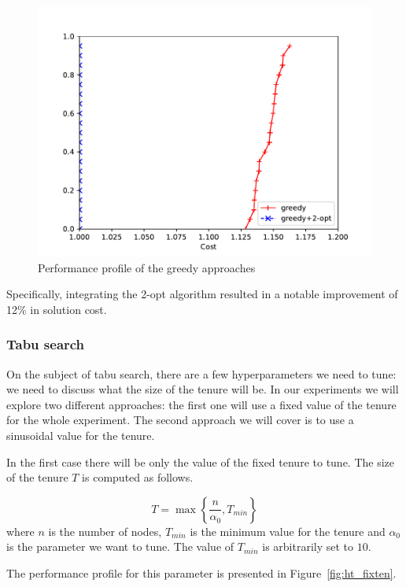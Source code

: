 \documentclass{article}
\begin{document}
\begin{figure}[ht]
        \caption{Performance profile of the greedy approaches}
        \label{fig:ht_greedy}
        \centering
        \includegraphics[width=340pt]{assets/ht_greedy.pdf}
\end{figure}

Specifically, integrating the 2-opt algorithm resulted in a notable improvement of 12\% in solution cost.

\clearpage

\subsubsection{Tabu search}
On the subject of tabu search, there are a few hyperparameters we need to tune:
we need to discuss what the size of the tenure will be. In our
experiments we will explore two different approaches: the first one will use
a fixed value of the tenure for the whole experiment. The second approach we
will cover is to use a sinusoidal value for the tenure.

In the first case there will be only the value of the fixed tenure to tune.
The size of the tenure $T$ is computed as follows.

\begin{equation*}
        T = \max \left\{
                \frac{n}{\alpha_0} ,
                T_{min}
        \right\}
\end{equation*}
where $n$ is the number of nodes, $T_{min}$ is the minimum value for the tenure
and $\alpha_0$ is the parameter we want to tune. The value of $T_{min}$ is arbitrarily
set to $10$.

The performance profile for this parameter is presented in Figure~\ref{fig:ht_fixten}.
\end{document}
